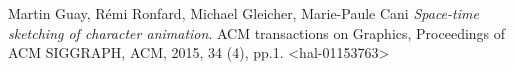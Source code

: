\begin{thebibliography}{9}
    Martin Guay, Rémi Ronfard, Michael Gleicher, Marie-Paule Cani
    \textit{Space-time sketching of character animation}. 
    ACM transactions on Graphics, Proceedings of ACM SIGGRAPH, ACM,
    2015, 34 (4), pp.1. <hal-01153763>
 
\end{thebibliography}

